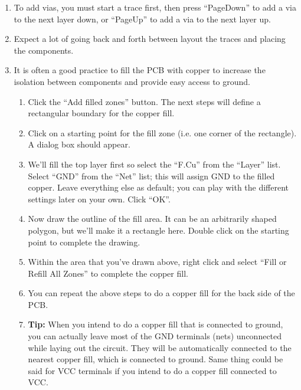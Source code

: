 \documentclass[12pt,letterpaper]{scrartcl}
\begin{document}
\begin{enumerate}
\begin{enumerate}
		\end{enumerate}
	\item To add vias, you must start a trace first, then press ``PageDown'' to add a via to the next layer down, or ``PageUp'' to add a via to the next layer up. 
	
	\item Expect a lot of going back and forth between layout the traces and placing the components. 
	
	\item It is often a good practice to fill the PCB with copper to increase the isolation between components and provide easy access to ground. 
		\begin{enumerate}
			\item Click the ``Add filled zones'' button. The next steps will define a rectangular boundary for the copper fill. 
			
			\item Click on a starting point for the fill zone (i.e. one corner of the rectangle). A dialog box should appear. 
			
			\item We'll fill the top layer first so select the ``F.Cu'' from the ``Layer'' list. Select ``GND'' from the ``Net'' list; this will assign GND to the filled copper. Leave everything else as default; you can play with the different settings later on your own. Click ``OK''.
			
			\item Now draw the outline of the fill area. It can be an arbitrarily shaped polygon, but we'll make it a rectangle here. Double click on the starting point to complete the drawing. 
			
			\item Within the area that you've drawn above, right click and select ``Fill or Refill All Zones'' to complete the copper fill. 
			
			\item You can repeat the above steps to do a copper fill for the back side of the PCB. 
			
			\item \textbf{Tip:} When you intend to do a copper fill that is connected to ground, you can actually leave most of the GND terminals (nets) unconnected while laying out the circuit. They will be automatically connected to the nearest copper fill, which is connected to ground. Same thing could be said for VCC terminals if you intend to do a copper fill connected to VCC. 
						

\end{enumerate}
\end{enumerate}
\end{document}
